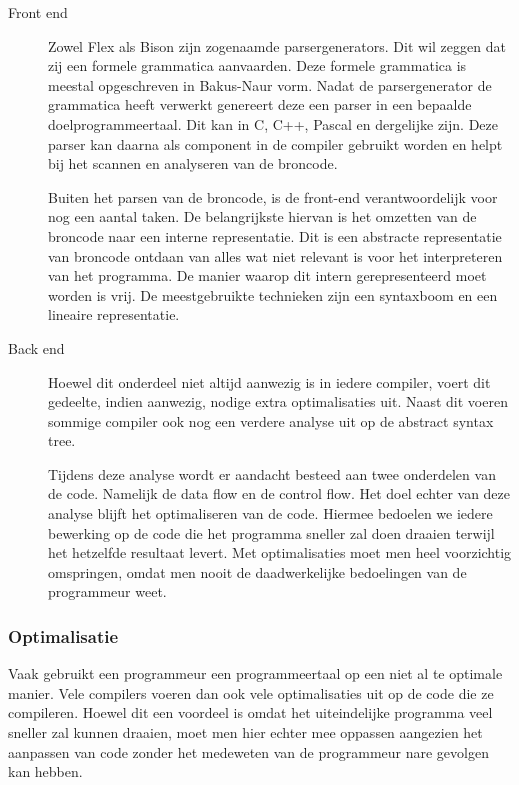 \documentclass[11pt,a4paper]{article}
\begin{document}
\begin{description}

\item[Front end]
Zowel Flex als Bison zijn zogenaamde parsergenerators. Dit wil zeggen dat zij een formele grammatica aanvaarden. Deze formele grammatica is meestal opgeschreven in Bakus-Naur vorm. Nadat de parsergenerator de grammatica heeft verwerkt genereert deze een parser in een bepaalde doelprogrammeertaal. Dit kan in C, C++, Pascal en dergelijke zijn. Deze parser kan daarna als component in de compiler gebruikt worden en helpt bij het scannen en analyseren van de broncode.

Buiten het parsen van de broncode, is de front-end verantwoordelijk voor nog een aantal taken. De belangrijkste hiervan is het omzetten van de broncode naar een interne representatie. Dit is een abstracte representatie van broncode ontdaan van alles wat niet relevant is voor het interpreteren van het programma. De manier waarop dit intern gerepresenteerd moet worden is vrij. De meestgebruikte technieken zijn een syntaxboom en een lineaire representatie. 

\item[Back end]
Hoewel dit onderdeel niet altijd aanwezig is in iedere compiler, voert dit gedeelte, indien aanwezig, nodige extra optimalisaties uit. Naast dit voeren sommige compiler ook nog een verdere analyse uit op de abstract syntax tree.

Tijdens deze analyse wordt er aandacht besteed aan twee onderdelen van de code. Namelijk de data flow en de control flow. Het doel echter van deze analyse blijft het optimaliseren van de code. Hiermee bedoelen we iedere bewerking op de code die het programma sneller zal doen draaien terwijl het hetzelfde resultaat levert. Met optimalisaties moet men heel voorzichtig omspringen, omdat men nooit de daadwerkelijke bedoelingen van de programmeur weet.

\end{description}

\subsubsection{Optimalisatie}

Vaak gebruikt een programmeur een programmeertaal op een niet al te optimale manier. Vele compilers voeren dan ook vele optimalisaties uit op de code die ze compileren. Hoewel dit een voordeel is omdat het uiteindelijke programma veel sneller zal kunnen draaien, moet men hier echter mee oppassen aangezien het aanpassen van code zonder het medeweten van de programmeur nare gevolgen kan hebben.
\end{document}
